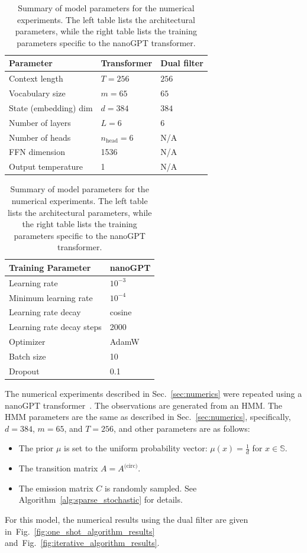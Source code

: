 \documentclass[twoside,11pt]{article}
\def\Sec#1{Sec.~\ref{#1}}
\def\Fig#1{Fig.~\ref{#1}}
\def\Sec#1{Sec.~\ref{#1}}
\def\Sec#1{Sec~\ref{#1}}
\def\Fig#1{Fig.~\ref{#1}}
\def\Sec#1{Sec.~\ref{#1}}
\def\bS{\begin{slide}}
\def\Sec#1{Sec.~\ref{#1}}
\def\bS{\mathbb{S}}
\begin{document}
\begin{table}[t]
  \centering
  \begin{tabularx}{0.55\textwidth}{l l l}
    \toprule
    \textbf{Parameter} & \textbf{Transformer} & \textbf{Dual filter} \\
    \midrule
    Context length & $T=256$ & $256$ \\
    Vocabulary size & $m=65$ & $65$ \\
    State (embedding) dim & $d=384$  & $384$ \\
    Number of layers & $L=6$ & 6 \\
    Number of heads & $n_{\text{head}}=6$ & N/A \\
    FFN dimension & 1536 & N/A\\
    Output temperature & 1 & N/A\\
    \bottomrule
  \end{tabularx}
    \hfill
  \begin{tabularx}{0.42\textwidth}{l l}
    \toprule
    \textbf{Training Parameter} & \textbf{nanoGPT} \\
    \midrule
    Learning rate & $10^{-3}$ \\
    Minimum learning rate & $10^{-4}$ \\
    Learning rate decay & cosine \\
    Learning rate decay steps & 2000 \\
    Optimizer & AdamW \\
    Batch size & 10 \\
    Dropout & 0.1 \\
    \bottomrule
  \end{tabularx}
  \caption{Summary of model parameters for the numerical experiments. The left table lists the architectural parameters, while the right table lists the training parameters specific to the nanoGPT transformer.}
  \label{tab:model_parameters}
  \vspace*{-25pt}
\end{table}

The numerical experiments described in \Sec{sec:numerics} were
repeated using a nanoGPT transformer~\citep{karpathy2024nanogpt}.  The
observations are generated from an HMM.  The HMM parameters are the same
as described in \Sec{sec:numerics}, specifically, $d = 384$, $m = 65$, and $T =
256$, and other parameters are as follows:
\begin{itemize}
\item  The prior $\mu$ is set to the uniform probability vector: $
  \mu(x) = \frac{1}{d}$ for $x\in\bS$.
\item The transition matrix $A=A^\text{(circ)}$.
\item The emission matrix $C$ is randomly sampled. See
  Algorithm~\ref{alg:sparse_stochastic} for details.
\end{itemize}
For this model, the numerical results using the dual filter are given 
in~\Fig{fig:one_shot_algorithm_results}
and~\Fig{fig:iterative_algorithm_results}. 
\end{document}
